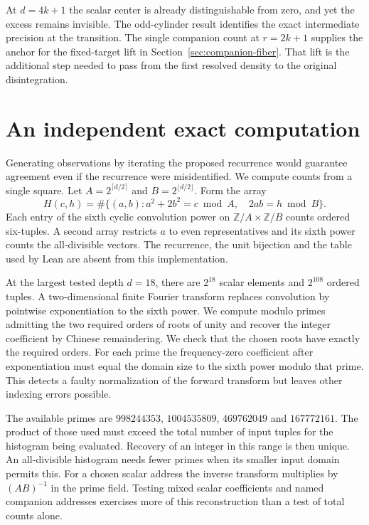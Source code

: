 \documentclass[12pt,letterpaper]{article}
\begin{document}
At $d=4k+1$ the scalar center is already distinguishable from zero, and yet the excess remains invisible. The odd-cylinder result identifies the exact intermediate precision at the transition. The single companion count at $r=2k+1$ supplies the anchor for the fixed-target lift in Section~\ref{sec:companion-fiber}. That lift is the additional step needed to pass from the first resolved density to the original disintegration.

\section{An independent exact computation}
Generating observations by iterating the proposed recurrence would guarantee agreement even if the recurrence were misidentified. We compute counts from a single square. Let $A=2^{\lceil d/2\rceil}$ and $B=2^{\lfloor d/2\rfloor}$. Form the array
\[
 H(c,h)=\#\{(a,b):a^2+2b^2=c\bmod A,\quad 2ab=h\bmod B\}.
\]
Each entry of the sixth cyclic convolution power on $\mathbb Z/A\times\mathbb Z/B$ counts ordered six-tuples. A second array restricts $a$ to even representatives and its sixth power counts the all-divisible vectors. The recurrence, the unit bijection and the table used by Lean are absent from this implementation.

At the largest tested depth $d=18$, there are $2^{18}$ scalar elements and $2^{108}$ ordered tuples. A two-dimensional finite Fourier transform replaces convolution by pointwise exponentiation to the sixth power. We compute modulo primes admitting the two required orders of roots of unity and recover the integer coefficient by Chinese remaindering. We check that the chosen roots have exactly the required orders. For each prime the frequency-zero coefficient after exponentiation must equal the domain size to the sixth power modulo that prime. This detects a faulty normalization of the forward transform but leaves other indexing errors possible.

The available primes are $998244353$, $1004535809$, $469762049$ and $167772161$. The product of those used must exceed the total number of input tuples for the histogram being evaluated. Recovery of an integer in this range is then unique. An all-divisible histogram needs fewer primes when its smaller input domain permits this. For a chosen scalar address the inverse transform multiplies by $(AB)^{-1}$ in the prime field. Testing mixed scalar coefficients and named companion addresses exercises more of this reconstruction than a test of total counts alone.
\end{document}
